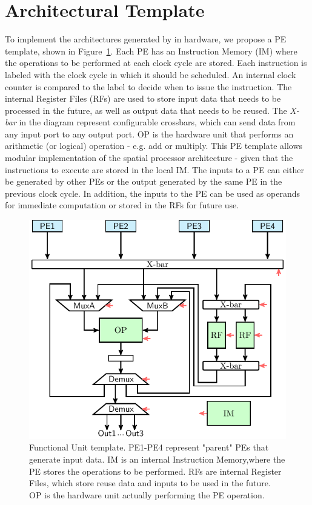 \vspace{-1mm}
\section{Architectural Template}
\label{sec:arch_template}
To implement the architectures generated by \frameworkname in hardware, we propose a PE template, shown in Figure~\ref{fig:FU_templ}. Each PE has an Instruction Memory (IM) where the operations to be performed at each clock cycle are stored. Each instruction is labeled with the clock cycle in which it should be scheduled. An internal clock counter is compared to the label to decide when to issue the instruction. The internal Register Files (RFs) are used to store input data that needs to be processed in the future, as well as output data that needs to be reused. The \textit{X-bar} in the diagram represent configurable crossbars, which can send data from any input port to any output port. OP is the hardware unit that performs an arithmetic (or logical) operation - e.g. add or multiply.
This PE template allows modular implementation of the spatial processor architecture - given that the instructions to execute are stored in the local IM. The inputs to a PE can either be generated by other PEs or the output generated by the same PE in the previous clock cycle. In addition, the inputs to the PE can be used as operands for immediate computation or stored in the RFs for future use. %

\begin{figure}[tb]
\centering
\includegraphics[width=.5\columnwidth]{images/functional_unit.pdf}
    \caption{\small Functional Unit template. PE1-PE4 represent "parent" PEs that generate input data. IM is an internal Instruction Memory,where the PE stores the operations to be performed. RFs are internal Register Files, which store reuse data and inputs to be used in the future. OP is the hardware unit actually performing the PE operation.}
\label{fig:FU_templ}
\squeezeup
\squeezeup
\end{figure}
